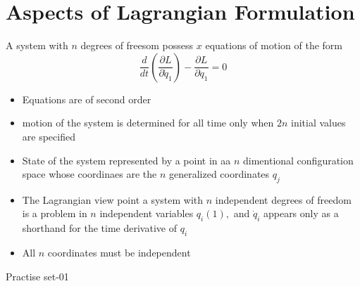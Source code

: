 \section{Aspects of Lagrangian Formulation}
A system with $n$ degrees of freesom possess $x$ equations of motion of the form
$$\frac{d}{dt}\left( \frac{\partial L}{\partial \dot{q}_1}\right)-\frac{\partial L}{\partial q_1}=0 $$
\begin{itemize}
	\item Equations are of second order
	\item motion of the system is determined for all time only when $2n$ initial values are specified
	\item State of the system represented by a point in aa $n$ dimentional configuration space whose coordinaes are the $n$ generalized coordinates $q_j$
	\item The Lagrangian view point a system with $n$ independent degrees of freedom is a problem in $n$ independent variables $q_i(1), $ and  $\dot{q}_i$ appears only as a shorthand for the time derivative of $q_i$
	\item All $n$ coordinates must be independent
\end{itemize}
\newpage
\begin{abox}
	Practise set-01
\end{abox}
